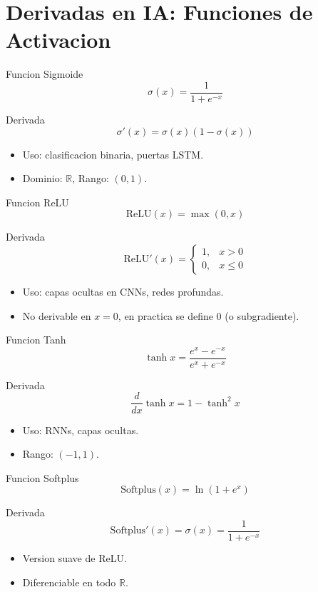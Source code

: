\documentclass[aspectratio=169, 10pt, xcolor=table]{beamer}
\begin{document}
\section{Derivadas en IA: Funciones de Activacion}

\begin{frame}{Funcion Sigmoide}
    \[
    \sigma(x) = \frac{1}{1+e^{-x}}
    \]
    \begin{block}{Derivada}
        \[
        \sigma'(x) = \sigma(x)(1 - \sigma(x))
        \]
    \end{block}
    \begin{itemize}
        \item Uso: clasificacion binaria, puertas LSTM.
        \item Dominio: $\mathbb{R}$, Rango: $(0,1)$.
    \end{itemize}
\end{frame}

\begin{frame}{Funcion ReLU}
    \[
    \text{ReLU}(x) = \max(0,x)
    \]
    \begin{block}{Derivada}
        \[
        \text{ReLU}'(x) = \begin{cases} 1, & x>0 \\ 0, & x\le 0 \end{cases}
        \]
    \end{block}
    \begin{itemize}
        \item Uso: capas ocultas en CNNs, redes profundas.
        \item No derivable en $x=0$, en practica se define $0$ (o subgradiente).
    \end{itemize}
\end{frame}

\begin{frame}{Funcion Tanh}
    \[
    \tanh x = \frac{e^x - e^{-x}}{e^x + e^{-x}}
    \]
    \begin{block}{Derivada}
        \[
        \frac{d}{dx}\tanh x = 1 - \tanh^2 x
        \]
    \end{block}
    \begin{itemize}
        \item Uso: RNNs, capas ocultas.
        \item Rango: $(-1,1)$.
    \end{itemize}
\end{frame}

\begin{frame}{Funcion Softplus}
    \[
    \text{Softplus}(x) = \ln(1+e^x)
    \]
    \begin{block}{Derivada}
        \[
        \text{Softplus}'(x) = \sigma(x) = \frac{1}{1+e^{-x}}
        \]
    \end{block}
    \begin{itemize}
        \item Version suave de ReLU.
        \item Diferenciable en todo $\mathbb{R}$.
    \end{itemize}
\end{frame}
\end{document}
